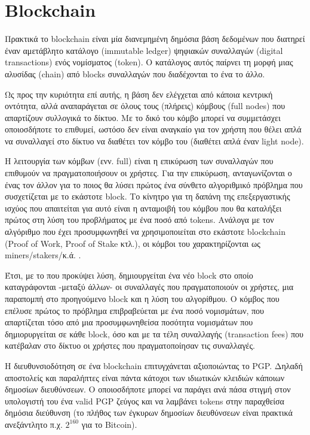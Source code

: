 \section{Blockchain}

Πρακτικά το blockchain είναι μία διανεμημένη δημόσια βάση δεδομένων που διατηρεί έναν αμετάβλητο κατάλογο (immutable ledger) ψηφιακών συναλλαγών (digital transactions) ενός νομίσματος (token). Ο κατάλογος αυτός παίρνει τη μορφή μιας αλυσίδας (chain) από blocks συναλλαγών που διαδέχονται το ένα το άλλο.

Ως προς την κυριότητα επί αυτής, η βάση δεν ελέγχεται από κάποια κεντρική οντότητα, αλλά αναπαράγεται σε όλους τους (πλήρεις) κόμβους (full nodes) που απαρτίζουν συλλογικά το δίκτυο. Με το δικό του κόμβο μπορεί να συμμετάσχει οποιοσδήποτε το επιθυμεί, ωστόσο δεν είναι αναγκαίο για τον χρήστη που θέλει απλά να συναλλαγεί στο δίκτυο να διαθέτει τον κόμβο του (διαθέτει απλά έναν light node).

Η λειτουργία των κόμβων (ενν. full) είναι η επικύρωση των συναλλαγών που επιθυμούν να πραγματοποιήσουν οι χρήστες. Για την επικύρωση, ανταγωνίζονται ο ένας τον άλλον για το ποιος θα λύσει πρώτος ένα σύνθετο αλγοριθμικό πρόβλημα που συσχετίζεται με το εκάστοτε block. Το κίνητρο για τη δαπάνη της επεξεργαστικής ισχύος που απαιτείται για αυτό είναι η ανταμοιβή του κόμβου που θα καταλήξει πρώτος στη λύση του προβλήματος  με ένα ποσό από tokens. Ανάλογα με τον αλγόριθμο που έχει προσυμφωνηθεί να χρησιμοποιείται στο εκάστοτε blockchain (Proof of Work, Proof of Stake κτλ.), οι κόμβοι του χαρακτηρίζονται ως miners/stakers/κ.ά. .

 Έτσι, με το που προκύψει λύση, δημιουργείται ένα νέο block στο οποίο καταγράφονται -μεταξύ άλλων- οι συναλλαγές που πραγματοποιούν οι χρήστες, μια παραπομπή στο προηγούμενο block και η λύση του αλγορίθμου.  O κόμβος που επέλυσε πρώτος το πρόβλημα επιβραβεύεται με ένα ποσό νομισμάτων, που απαρτίζεται τόσο από μια προσυμφωνηθείσα ποσότητα νομισμάτων που δημιορυργείται σε κάθε block, όσο και με τα τέλη συναλλαγής (transaction fees) που κατέβαλαν στο δίκτυο οι χρήστες που πραγματοποίησαν τις συναλλαγές.


Η διευθυνσιοδότηση σε ένα blockchain επιτυγχάνεται αξιοποιώντας το PGP. Δηλαδή  αποστολείς και παραλήπτες είναι πάντα κάτοχοι των ιδιωτικών κλειδιών κάποιων δημοσίων διευθύνσεων. Ο οποιοσδήποτε μπορεί να παράγει ανά πάσα στιγμή στον υπολογιστή του ένα valid PGP ζεύγος και να λαμβάνει tokens στην παραχθείσα δημόσια διεύθυνση (το πλήθος των έγκυρων δημοσίων διευθύνσεων είναι πρακτικά ανεξάντλητο π.χ. $2^{160}$ για το Bitcoin).

